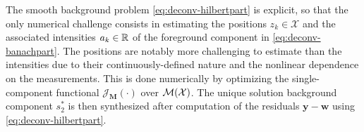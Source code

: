     
        
        The smooth background problem \eqref{eq:deconv-hilbertpart} is explicit, so that the only numerical challenge consists in estimating the positions $z_k \in \mathcal{X}$ and the associated intensities $a_k \in \mathbb{R}$ of the foreground component in \eqref{eq:deconv-banachpart}. The positions are notably more challenging to estimate than the intensities due to their continuously-defined nature and the nonlinear dependence on the measurements. This is done numerically by optimizing the single-component functional $\mathcal{J}_{\mathbf{M}}(\cdot)$ over ${\mathcal{M}}({\mathcal{X}})$.
        The unique solution background component $s_2^*$ is then synthesized after computation of the residuals $\bm{y}-\bm{w}$ using \eqref{eq:deconv-hilbertpart}.

